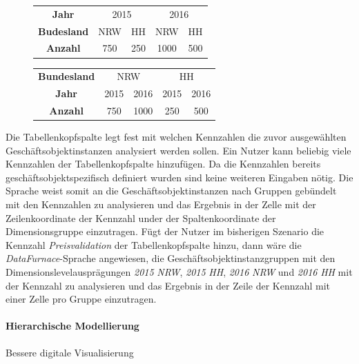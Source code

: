 \documentclass[
  language=german, %
  type=bachelor%
]{isthesis}
\begin{document}
\begin{content}
  \begin{figure}[caption={Auswertung des Geschäftsobjets \textit{Produkt}}, label={table:auftrittsreihenfolge}]
    \footnotesize
    \begin{tabular}{c c c c c}
      \textbf{Jahr} & \multicolumn{2}{c}{2015} & \multicolumn{2}{c}{2016} \\
      \textbf{Budesland} & NRW & HH & NRW & HH \\
      \toprule
      \textbf{Anzahl} & 750 & 250 & 1000 & 500\\
    \end{tabular}
    \begin{tabular}{c c c c c}
      \textbf{Bundesland} & \multicolumn{2}{c}{NRW} & \multicolumn{2}{c}{HH} \\
      \textbf{Jahr} & 2015 & 2016 & 2015 & 2016 \\
      \toprule
      \textbf{Anzahl} & 750 & 1000 & 250 & 500 \\
    \end{tabular}
  \end{figure}

  Die Tabellenkopfspalte legt fest mit welchen Kennzahlen die zuvor
  ausgewählten Geschäftsobjektinstanzen analysiert werden sollen. Ein Nutzer
  kann beliebig viele Kennzahlen der Tabellenkopfspalte hinzufügen. Da die
  Kennzahlen bereits geschäftsobjektspezifisch definiert wurden sind keine
  weiteren Eingaben nötig. Die Sprache weist somit an die
  Geschäftsobjektinstanzen nach Gruppen gebündelt mit den Kennzahlen zu
  analysieren und das Ergebnis in der Zelle mit der Zeilenkoordinate der
  Kennzahl under der Spaltenkoordinate der Dimensionsgruppe einzutragen. Fügt
  der Nutzer im bisherigen Szenario die Kennzahl \textit{Preisvalidation} der
  Tabellenkopfspalte hinzu, dann wäre die \textit{DataFurnace}-Sprache angewiesen,
  die Geschäftsobjektinstanzgruppen mit den Dimensionslevelausprägungen
  \textit{2015} \textit{NRW}, \textit{2015} \textit{HH}, \textit{2016}
  \textit{NRW} und \textit{2016} \textit{HH} mit der Kennzahl zu analysieren
  und das Ergebnis in der Zeile der Kennzahl mit einer Zelle pro Gruppe
  einzutragen.


  \paragraph{Hierarchische Modellierung}
  Bessere digitale Visualisierung~\citep[][S. 6 f.]{fleischer2013konstruktion}



\end{content}
\end{document}
